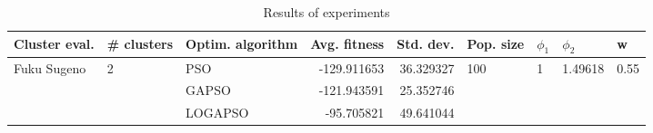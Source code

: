 \begin{table}
\centering
\caption{Results of experiments}
\begin{tabular}{lllrrllll}
\toprule
               Cluster eval. &        \# clusters & Optim. algorithm &  Avg. fitness &  Std. dev. &            Pop. size &         $\phi_{1}$ &               $\phi_{2}$ &                     w \\
\midrule
\multirow{3}{*}{Fuku Sugeno} & \multirow{3}{*}{2} &              PSO &   -129.911653 &  36.329327 & \multirow{3}{*}{100} & \multirow{3}{*}{1} & \multirow{3}{*}{1.49618} & \multirow{3}{*}{0.55} \\
                             &                    &            GAPSO &   -121.943591 &  25.352746 &                      &                    &                          &                       \\
                             &                    &          LOGAPSO &    -95.705821 &  49.641044 &                      &                    &                          &                       \\
\bottomrule
\end{tabular}
\end{table}
